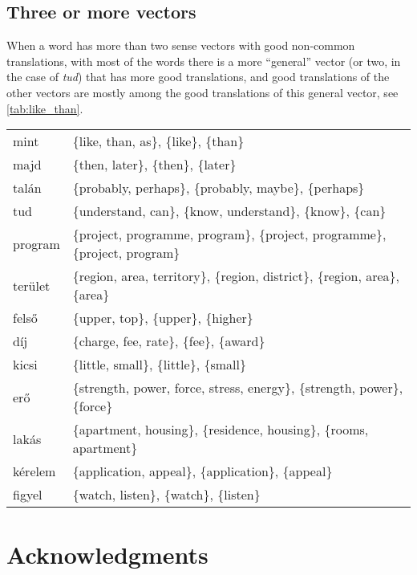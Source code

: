 \documentclass[11pt]{article}
\begin{document}
\subsection{Three or more vectors}

When a word has more than two sense vectors with good non-common translations,
with most of the words there is a more ``general'' vector (or two, in the case
of \emph{tud}) that has more good translations, and good translations of the
other vectors are mostly among the good translations of this general vector,
see \cref{tab:like_than}.

\begin{table*}[t]
  \begin{tabular}{ll}
    \toprule
    mint	& \{like, than, as\}, \{like\}, \{than\}	\\
    majd	& \{then, later\}, \{then\}, \{later\}	\\
    talán	& \{probably, perhaps\}, \{probably, maybe\}, \{perhaps\}	\\
    tud	& \{understand, can\}, \{know, understand\}, \{know\}, \{can\}	\\
    program	& \{project, programme, program\}, \{project, programme\}, \{project, program\}	\\
    terület	& \{region, area, territory\}, \{region, district\}, \{region, area\}, \{area\}	\\
    felső	& \{upper, top\}, \{upper\}, \{higher\}	\\
    díj	& \{charge, fee, rate\}, \{fee\}, \{award\}	\\
    kicsi	& \{little, small\}, \{little\}, \{small\}	\\
    erő	& \{strength, power, force, stress, energy\}, \{strength, power\}, \{force\}	\\
    lakás	& \{apartment, housing\}, \{residence, housing\}, \{rooms, apartment\}	\\
    kérelem	& \{application, appeal\}, \{application\}, \{appeal\}	\\
    figyel	& \{watch, listen\}, \{watch\}, \{listen\}	\\
    \bottomrule
  \end{tabular}
  \caption{Words with at least three good sense vectors (forward NNs, source is
  the AdaGram model trained on HNC (600 dimensions, $\alpha=.05$)}
  \label{tab:like_than}
\end{table*}

\section{Acknowledgments}
\end{document}
